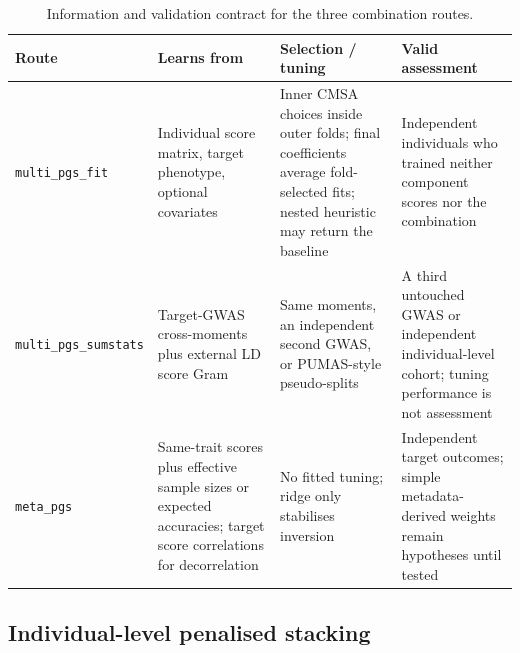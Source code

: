 \documentclass[11pt,a4paper]{article}
\newcommand{\code}[1]{\texttt{#1}}
\begin{document}
\begin{table}[ht]
\centering
\caption{Information and validation contract for the three
  combination routes.}
\label{tab:routes}
\scriptsize
\begin{tabularx}{\linewidth}{@{}L{26mm}Y Y Y@{}}
\toprule
\textbf{Route} & \textbf{Learns from} & \textbf{Selection / tuning} &
\textbf{Valid assessment} \\
\midrule
\code{multi\_pgs\_fit} & Individual score matrix, target
phenotype, optional covariates & Inner CMSA choices inside outer
folds; final coefficients average fold-selected fits; nested
heuristic may return the baseline &
Independent individuals who trained neither component scores nor
the combination \\
\code{multi\_pgs\_sumstats} & Target-GWAS cross-moments plus
external LD score Gram & Same moments, an independent second
GWAS, or PUMAS-style pseudo-splits & A third untouched GWAS or
independent individual-level cohort; tuning performance is not
assessment \\
\code{meta\_pgs} & Same-trait scores plus effective sample sizes
or expected accuracies; target score correlations for
decorrelation & No fitted tuning; ridge only stabilises inversion
& Independent target outcomes; simple metadata-derived weights
remain hypotheses until tested \\
\bottomrule
\end{tabularx}
\end{table}

\subsection{Individual-level penalised stacking}
\label{sec:individual}
\end{document}
